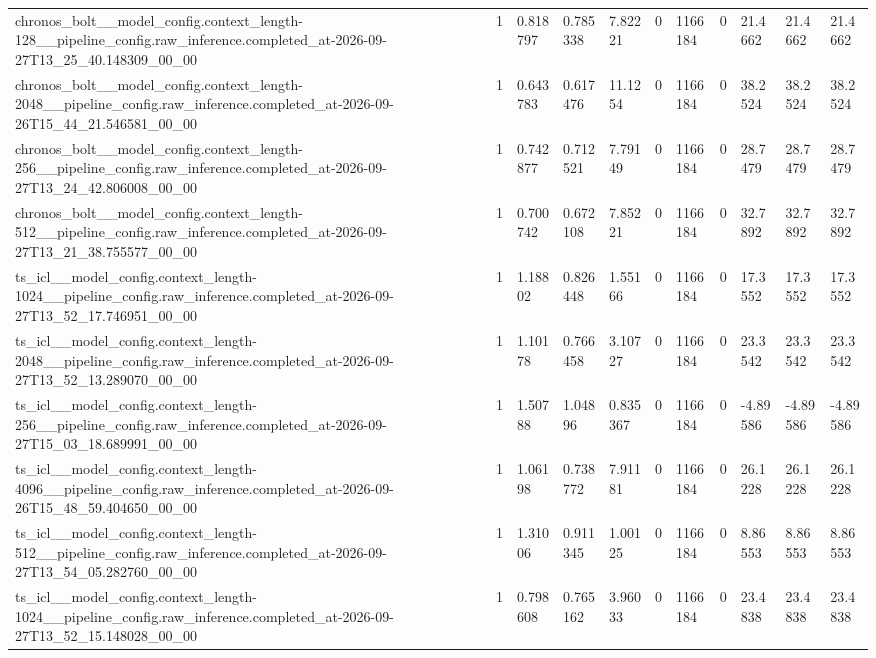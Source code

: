 \begin{tabular}{lllllllllll}
chronos\_bolt\_\_model\_config.context\_length-128\_\_pipeline\_config.raw\_inference.completed\_at-2026-09-27T13\_25\_40.148309\_00\_00 & 1 & 0.818797 & 0.785338 & 7.82221 & 0 & 1166184 & 0 & 21.4662 & 21.4662 & 21.4662 \\
chronos\_bolt\_\_model\_config.context\_length-2048\_\_pipeline\_config.raw\_inference.completed\_at-2026-09-26T15\_44\_21.546581\_00\_00 & 1 & 0.643783 & 0.617476 & 11.1254 & 0 & 1166184 & 0 & 38.2524 & 38.2524 & 38.2524 \\
chronos\_bolt\_\_model\_config.context\_length-256\_\_pipeline\_config.raw\_inference.completed\_at-2026-09-27T13\_24\_42.806008\_00\_00 & 1 & 0.742877 & 0.712521 & 7.79149 & 0 & 1166184 & 0 & 28.7479 & 28.7479 & 28.7479 \\
chronos\_bolt\_\_model\_config.context\_length-512\_\_pipeline\_config.raw\_inference.completed\_at-2026-09-27T13\_21\_38.755577\_00\_00 & 1 & 0.700742 & 0.672108 & 7.85221 & 0 & 1166184 & 0 & 32.7892 & 32.7892 & 32.7892 \\
ts\_icl\_\_model\_config.context\_length-1024\_\_pipeline\_config.raw\_inference.completed\_at-2026-09-27T13\_52\_17.746951\_00\_00 & 1 & 1.18802 & 0.826448 & 1.55166 & 0 & 1166184 & 0 & 17.3552 & 17.3552 & 17.3552 \\
ts\_icl\_\_model\_config.context\_length-2048\_\_pipeline\_config.raw\_inference.completed\_at-2026-09-27T13\_52\_13.289070\_00\_00 & 1 & 1.10178 & 0.766458 & 3.10727 & 0 & 1166184 & 0 & 23.3542 & 23.3542 & 23.3542 \\
ts\_icl\_\_model\_config.context\_length-256\_\_pipeline\_config.raw\_inference.completed\_at-2026-09-27T15\_03\_18.689991\_00\_00 & 1 & 1.50788 & 1.04896 & 0.835367 & 0 & 1166184 & 0 & -4.89586 & -4.89586 & -4.89586 \\
ts\_icl\_\_model\_config.context\_length-4096\_\_pipeline\_config.raw\_inference.completed\_at-2026-09-26T15\_48\_59.404650\_00\_00 & 1 & 1.06198 & 0.738772 & 7.91181 & 0 & 1166184 & 0 & 26.1228 & 26.1228 & 26.1228 \\
ts\_icl\_\_model\_config.context\_length-512\_\_pipeline\_config.raw\_inference.completed\_at-2026-09-27T13\_54\_05.282760\_00\_00 & 1 & 1.31006 & 0.911345 & 1.00125 & 0 & 1166184 & 0 & 8.86553 & 8.86553 & 8.86553 \\
ts\_icl\_\_model\_config.context\_length-1024\_\_pipeline\_config.raw\_inference.completed\_at-2026-09-27T13\_52\_15.148028\_00\_00 & 1 & 0.798608 & 0.765162 & 3.96033 & 0 & 1166184 & 0 & 23.4838 & 23.4838 & 23.4838 \\

\end{tabular}
